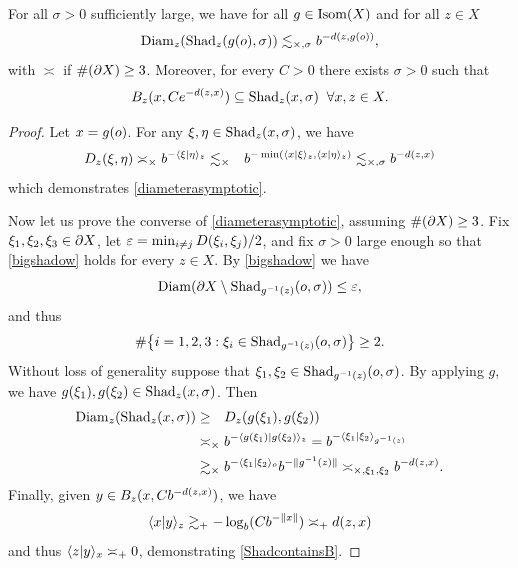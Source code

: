 \begin{lemma}
\label{lemmadiameterasymptotic}
For all $\sigma > 0$ sufficiently large, we have for all $g\in\operatorname{Isom}(X)$ and for all $z\in X$
\begin{equation}
\label{diameterasymptotic}
\operatorname{Diam}_z(\operatorname{Shad}_z(g(o),\sigma)) \lesssim_{\times,\sigma} b^{-d(z,g(o))},
\end{equation}
with $\asymp$ if $\#(\partial X)\geq 3$. Moreover, for every $C > 0$ there exists $\sigma > 0$ such that
\begin{equation}
\label{ShadcontainsB}
B_z(x,C e^{-d(z,x)}) \subseteq \operatorname{Shad}_z(x,\sigma) \;\;\forall x,z\in X.
\end{equation}
\end{lemma}
\begin{proof}
Let $x = g(o)$. For any $\xi,\eta\in \operatorname{Shad}_z(x,\sigma)$, we have
\begin{align*}
D_z(\xi,\eta) \asymp_\times b^{-\langle\xi|\eta\rangle_z}
\lesssim_{\times\phantom{,\sigma}} b^{-\min\left(\langle x|\xi\rangle_z,\langle x|\eta\rangle_z\right)}
\lesssim_{\times,\sigma} b^{-d(z,x)}
\end{align*}
which demonstrates \eqref{diameterasymptotic}.

Now let us prove the converse of \eqref{diameterasymptotic}, assuming $\#(\partial X)\geq 3$. Fix $\xi_1,\xi_2,\xi_3\in\partial X$, let $\varepsilon = \min_{i\neq j}D(\xi_i,\xi_j)/2$, and fix $\sigma > 0$ large enough so that \eqref{bigshadow} holds for every $z\in X$. By \eqref{bigshadow} we have
\[
\operatorname{Diam}(\partial X\setminus \operatorname{Shad}_{g^{-1}(z)}(o,\sigma)) \leq \varepsilon,
\]
and thus
\[
\#\big\{i = 1,2,3: \xi_i\in \operatorname{Shad}_{g^{-1}(z)}(o,\sigma)\big\}\geq 2.
\]
Without loss of generality suppose that $\xi_1,\xi_2\in \operatorname{Shad}_{g^{-1}(z)}(o,\sigma)$. By applying $g$, we have $g(\xi_1),g(\xi_2)\in \operatorname{Shad}_z(x,\sigma)$. Then
\begin{align*}
\Diam_z(\Shad_z(x,\sigma))
&\geq_\pt \Dist_z(g(\xi_1),g(\xi_2))\\
&\asymp_\times b^{-\lb g(\xi_1)|g(\xi_2)\rb_z}
= b^{-\lb \xi_1|\xi_2\rb_{g^{-1}(z)}}\\
&\gtrsim_\times b^{-\lb\xi_1|\xi_2\rb_\zero}b^{-\dox{g^{-1}(z)}}
\asymp_{\times,\xi_1,\xi_2}b^{-\dist(z,x)}.
\end{align*}
Finally, given $y\in B_z(x,C b^{-d(z,x)})$, we have
\[
\langle x|y\rangle_z \gtrsim_+ -\log_b(C b^{-\|x\|}) \asymp_+ d(z,x)
\]
and thus $\langle z|y\rangle_x \asymp_+ 0$, demonstrating \eqref{ShadcontainsB}.
\end{proof}



